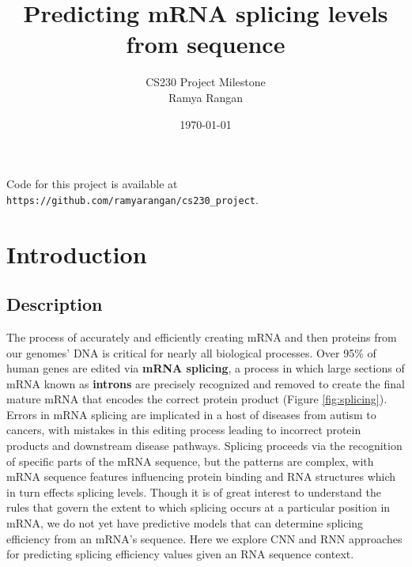 \documentclass[10.5pt]{article}
\begin{document}
\title{Predicting mRNA splicing levels from sequence}
\author{CS230 Project Milestone \\[1em]
Ramya Rangan}
\date{\today}
\maketitle

Code for this project is available at \texttt{https://github.com/ramyarangan/cs230\_project}.
\section{Introduction}
\subsection{Description}
The process of accurately and efficiently creating mRNA and then proteins from our genomes' DNA is critical for nearly all biological processes. Over 95\% of human genes are edited via {\bf mRNA splicing}, a process in which large sections of mRNA known as {\bf introns} are precisely recognized and removed to create the final mature mRNA that encodes the correct protein product (Figure \ref{fig:splicing}). Errors in mRNA splicing are implicated in a host of diseases from autism to cancers, with mistakes in this editing process leading to incorrect protein products and downstream disease pathways. Splicing proceeds via the recognition of specific parts of the mRNA sequence, but the patterns are complex, with mRNA sequence features influencing protein binding and RNA structures which in turn effects splicing levels. Though it is of great interest to understand the rules that govern the extent to which splicing occurs at a particular position in mRNA, we do not yet have predictive models that can determine splicing efficiency from an mRNA's sequence. Here we explore CNN and RNN approaches for predicting splicing efficiency values given an RNA sequence context.
\end{document}

